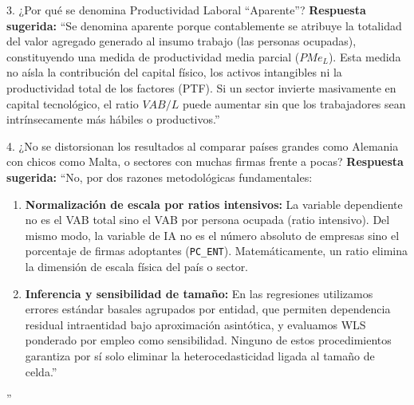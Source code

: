 \documentclass[11pt,a4paper]{article}
\begin{document}
\vspace{0.2cm}

\begin{qbox}{3. ¿Por qué se denomina Productividad Laboral ``Aparente''?}
\textbf{Respuesta sugerida:}  
``Se denomina aparente porque contablemente se atribuye la totalidad del valor agregado generado al insumo trabajo (las personas ocupadas), constituyendo una medida de productividad media parcial ($PMe_L$). Esta medida no aísla la contribución del capital físico, los activos intangibles ni la productividad total de los factores (PTF). Si un sector invierte masivamente en capital tecnológico, el ratio $VAB/L$ puede aumentar sin que los trabajadores sean intrínsecamente más hábiles o productivos.''
\end{qbox}

\vspace{0.2cm}

\begin{qbox}{4. ¿No se distorsionan los resultados al comparar países grandes como Alemania con chicos como Malta, o sectores con muchas firmas frente a pocas?}
\textbf{Respuesta sugerida:}  
``No, por dos razones metodológicas fundamentales:
\begin{enumerate}[itemsep=0.1em]
  \item \textbf{Normalización de escala por ratios intensivos:} La variable dependiente no es el VAB total sino el VAB por persona ocupada (ratio intensivo). Del mismo modo, la variable de IA no es el número absoluto de empresas sino el porcentaje de firmas adoptantes (\texttt{PC\_ENT}). Matemáticamente, un ratio elimina la dimensión de escala física del país o sector.
  \item \textbf{Inferencia y sensibilidad de tamaño:} En las regresiones utilizamos errores estándar basales agrupados por entidad, que permiten dependencia residual intraentidad bajo aproximación asintótica, y evaluamos WLS ponderado por empleo como sensibilidad. Ninguno de estos procedimientos garantiza por sí solo eliminar la heterocedasticidad ligada al tamaño de celda.''
\end{enumerate}''
\end{qbox}

\vspace{0.2cm}
\end{document}
